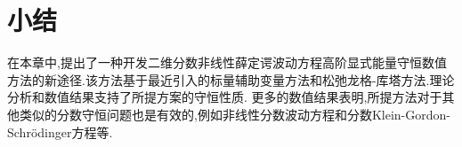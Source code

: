 \section{小结}\label{Section_SAVRRK: 7}
在本章中,提出了一种开发二维分数非线性薛定谔波动方程高阶显式能量守恒数值方法的新途径.该方法基于最近引入的标量辅助变量方法和松弛龙格-库塔方法.理论分析和数值结果支持了所提方案的守恒性质.
更多的数值结果表明,所提方法对于其他类似的分数守恒问题也是有效的,例如非线性分数波动方程和分数Klein-Gordon-Schr{\"o}dinger方程等.

	


